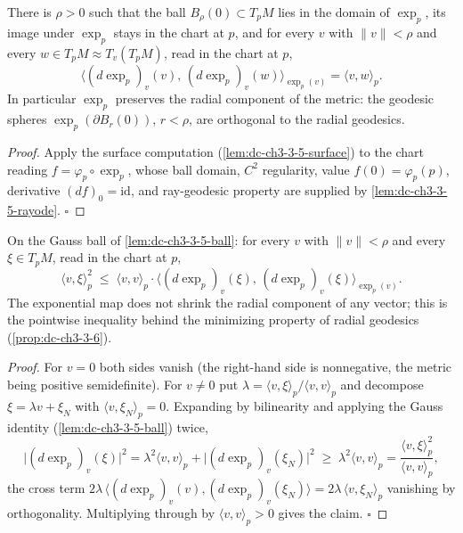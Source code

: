 \begin{lemma}
  \label{lem:dc-ch3-3-5-ball}
  \leanok
  There is $\rho > 0$ such that the ball $B_\rho(0) \subset T_pM$ lies in the
  domain of $\exp_p$, its image under $\exp_p$ stays in the chart at $p$, and
  for every $v$ with $\|v\| < \rho$ and every
  $w \in T_pM \approx T_v(T_pM)$, read in the chart at $p$,
  $$\big\langle (d\exp_p)_v(v),\, (d\exp_p)_v(w) \big\rangle_{\exp_p(v)}
    = \langle v, w\rangle_p.$$
  In particular $\exp_p$ preserves the radial component of the metric: the
  geodesic spheres $\exp_p(\partial B_r(0))$, $r < \rho$, are orthogonal to
  the radial geodesics.
\end{lemma}
\begin{proof}
  \leanok
  Apply the surface computation (\cref{lem:dc-ch3-3-5-surface}) to the chart
  reading $f = \varphi_p \circ \exp_p$, whose ball domain, $C^2$ regularity,
  value $f(0)=\varphi_p(p)$, derivative $(df)_0 = \mathrm{id}$, and
  ray-geodesic property are supplied by \cref{lem:dc-ch3-3-5-rayode}.
  $\square$
\end{proof}

\begin{lemma}
  \label{lem:dc-ch3-3-5-radial}
  \leanok
  On the Gauss ball of \cref{lem:dc-ch3-3-5-ball}: for every $v$ with
  $\|v\| < \rho$ and every $\xi \in T_pM$, read in the chart at $p$,
  $$\langle v, \xi\rangle_p^2
    \;\le\; \langle v, v\rangle_p \cdot
      \big\langle (d\exp_p)_v(\xi),\, (d\exp_p)_v(\xi)\big\rangle_{\exp_p(v)}.$$
  The exponential map does not shrink the radial component of any vector;
  this is the pointwise inequality behind the minimizing property of radial
  geodesics (\cref{prop:dc-ch3-3-6}).
\end{lemma}
\begin{proof}
  \leanok
  For $v = 0$ both sides vanish (the right-hand side is nonnegative, the
  metric being positive semidefinite). For $v \ne 0$ put
  $\lambda = \langle v,\xi\rangle_p / \langle v,v\rangle_p$ and decompose
  $\xi = \lambda v + \xi_N$ with $\langle v, \xi_N\rangle_p = 0$. Expanding by
  bilinearity and applying the Gauss identity (\cref{lem:dc-ch3-3-5-ball})
  twice,
  $$\big|(d\exp_p)_v(\xi)\big|^2
    = \lambda^2 \langle v,v\rangle_p
      + \big|(d\exp_p)_v(\xi_N)\big|^2
    \;\ge\; \lambda^2 \langle v,v\rangle_p
    = \frac{\langle v,\xi\rangle_p^2}{\langle v,v\rangle_p},$$
  the cross term $2\lambda\,\langle (d\exp_p)_v(v), (d\exp_p)_v(\xi_N)\rangle
  = 2\lambda\,\langle v, \xi_N\rangle_p$ vanishing by orthogonality.
  Multiplying through by $\langle v,v\rangle_p > 0$ gives the claim.
  $\square$
\end{proof}

